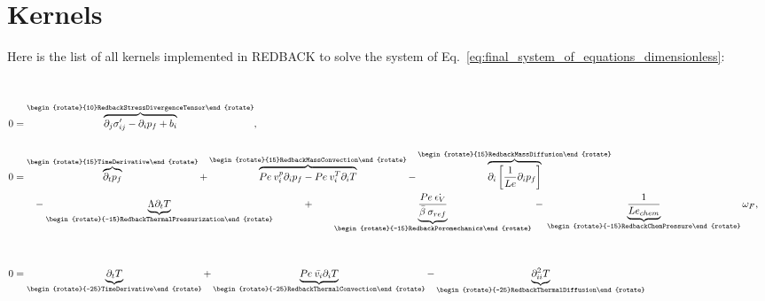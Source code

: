 \documentclass[]{scrreprt}
\newcommand{\redback}{{REDBACK}}
\newcommand{\pd}{\ensuremath{\partial}}
\newcommand{\pdiff}[2]{\ensuremath{\pd_{#2} #1}}
\begin{document}
\section{Kernels}
Here is the list of all kernels implemented in \redback{} to solve the system of Eq.~\ref{eq:final_system_of_equations_dimensionless}:
\begin{align*}
  \\ \\ 
  0 &= \overbrace{ \pdiff{\sigma^{\prime}_{ij}}{j} - \pdiff{p_f}{i} + b_i }^{\begin{rotate}{10}RedbackStressDivergenceTensor\end{rotate}} , \\ 
  \\   
  0 &= \overbrace{ \pdiff{p_f}{t} }^{\begin{rotate}{15}TimeDerivative\end{rotate}} 
       + \overbrace{ Pe\: v^p_i \pdiff{p_f}{i}
       - Pe\:v^T_i \pdiff{T}{i} }^{\begin{rotate}{15}RedbackMassConvection\end{rotate}} 
       - \overbrace{ \pdiff{\left[\frac{1}{Le} \pdiff{p_f}{i} \right]}{i} }^{\begin{rotate}{15}RedbackMassDiffusion\end{rotate}} 
       \\ \nonumber
  ~ & \qquad 
  - \underbrace{ \Lambda \pdiff{T}{t} }_{\begin{rotate}{-15}RedbackThermalPressurization\end{rotate}} 
  \qquad\quad+ \qquad \underbrace{ \frac{Pe\:\dot{\epsilon_V}}{\bar{\beta}\:\sigma_{ref}}  }_{\begin{rotate}{-15}RedbackPoromechanics\end{rotate}} 
  \: - \: \underbrace{ \frac{1}{Le_{chem}}  }_{\begin{rotate}{-15}RedbackChemPressure\end{rotate}} 
  \omega_F, \\ \\ \\
  0 &= \underbrace{ \pdiff{T}{t}   }_{\begin{rotate}{-25}TimeDerivative\end{rotate}} 
  +  \underbrace{ Pe\:\bar{v_i}\pdiff{T}{i}   }_{\begin{rotate}{-25}RedbackThermalConvection\end{rotate}} 
  - \underbrace{ \pd_{ii}^2 T   }_{\begin{rotate}{-25}RedbackThermalDiffusion\end{rotate}}  

\end{align*}
\end{document}
